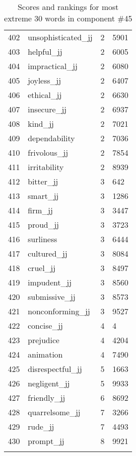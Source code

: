 \begin{longtable}[!htbp]{| rlr@{.}l |}
    402 & unsophisticated\_jj & 2 & 5901 \\
    403 & helpful\_jj & 2 & 6005 \\
    404 & impractical\_jj & 2 & 6080 \\
    405 & joyless\_jj & 2 & 6407 \\
    406 & ethical\_jj & 2 & 6630 \\
    407 & insecure\_jj & 2 & 6937 \\
    408 & kind\_jj & 2 & 7021 \\
    409 & dependability & 2 & 7036 \\
    410 & frivolous\_jj & 2 & 7854 \\
    411 & irritability & 2 & 8939 \\
    412 & bitter\_jj & 3 & 642 \\
    413 & smart\_jj & 3 & 1286 \\
    414 & firm\_jj & 3 & 3447 \\
    415 & proud\_jj & 3 & 3723 \\
    416 & surliness & 3 & 6444 \\
    417 & cultured\_jj & 3 & 8084 \\
    418 & cruel\_jj & 3 & 8497 \\
    419 & impudent\_jj & 3 & 8560 \\
    420 & submissive\_jj & 3 & 8573 \\
    421 & nonconforming\_jj & 3 & 9527 \\
    422 & concise\_jj & 4 & 4 \\
    423 & prejudice & 4 & 4204 \\
    424 & animation & 4 & 7490 \\
    425 & disrespectful\_jj & 5 & 1663 \\
    426 & negligent\_jj & 5 & 9933 \\
    427 & friendly\_jj & 6 & 8692 \\
    428 & quarrelsome\_jj & 7 & 3266 \\
    429 & rude\_jj & 7 & 4493 \\
    430 & prompt\_jj & 8 & 9921 \\
    \hline
    \caption{Scores and rankings for most extreme 30 words in component \#45} \\
\end{longtable}
